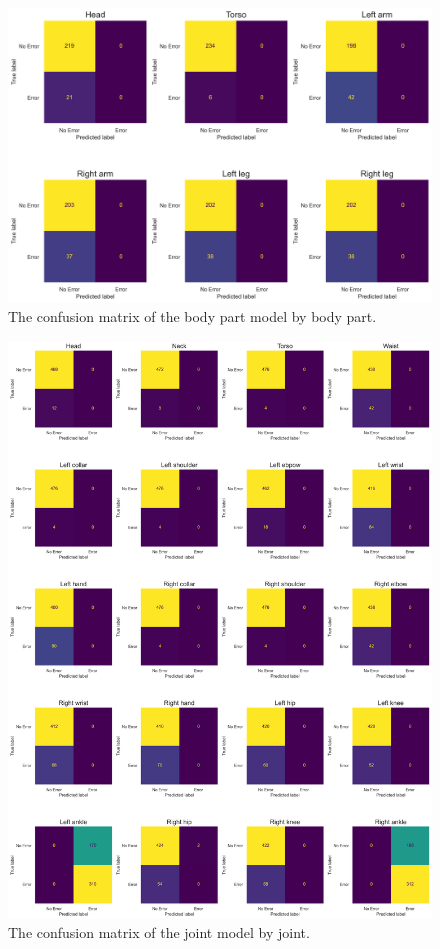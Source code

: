 \begin{figure}[htbp]
  \centering
  \includegraphics[width=\textwidth]{figures/Results/v2/confusion/body_parts_part.png}
  \caption[Body Parts Confusion Matrix by Body Part]{The confusion matrix of the body part model by body part.}
  \label{fig:conf_v2_bp}
\end{figure}





\begin{figure}[htbp]
  \centering
  \includegraphics[width=\textwidth]{figures/Results/v2/confusion/joints_joint.png}
  \caption[Joint Model Confusion Matrix by Joint]{The confusion matrix of the joint model by joint.}
  \label{fig:conf_v2_bp}
\end{figure}